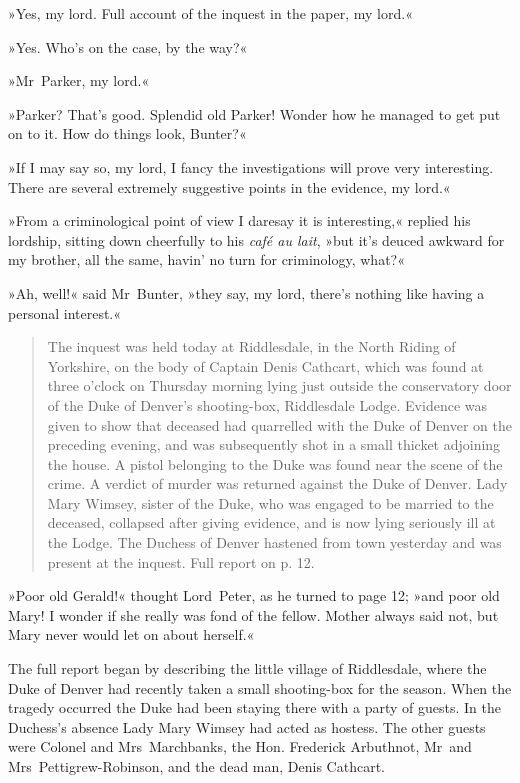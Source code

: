 »Yes, my lord. Full account of the inquest in the paper, my lord.«

»Yes. Who's on the case, by the way?«

»Mr~Parker, my lord.«

»Parker? That's good. Splendid old Parker! Wonder how he managed to get put on to it. How do things look, Bunter?«

»If I may say so, my lord, I fancy the investigations will prove very interesting. There are several extremely suggestive points in the evidence, my lord.«

»From a criminological point of view I daresay it is interesting,« replied his lordship, sitting down cheerfully to his \foreignlanguage{french}{\textit{café au lait}}, »but it's deuced awkward for my brother, all the same, havin' no turn for criminology, what?«

»Ah, well!« said Mr~Bunter, »they say, my lord, there's nothing like having a personal interest.«

\begin{quote}
\indent The inquest was held today at Riddlesdale, in the North Riding of Yorkshire, on the body of Captain Denis Cathcart, which was found at three o'clock on Thursday morning lying just outside the conservatory door of the Duke of Denver's shooting-box, Riddlesdale Lodge. Evidence was given to show that deceased had quarrelled with the Duke of Denver on the preceding evening, and was subsequently shot in a small thicket adjoining the house. A pistol belonging to the Duke was found near the scene of the crime. A verdict of murder was returned against the Duke of Denver. Lady Mary Wimsey, sister of the Duke, who was engaged to be married to the deceased, collapsed after giving evidence, and is now lying seriously ill at the Lodge. The Duchess of Denver hastened from town yesterday and was present at the inquest. Full report on p. 12.  
\end{quote}

»Poor old Gerald!« thought Lord~Peter, as he turned to page 12; »and poor old Mary! I wonder if she really was fond of the fellow. Mother always said not, but Mary never would let on about herself.«

The full report began by describing the little village of Riddlesdale, where the Duke of Denver had recently taken a small shooting-box for the season. When the tragedy occurred the Duke had been staying there with a party of guests. In the Duchess's absence Lady Mary Wimsey had acted as hostess. The other guests were Colonel and Mrs~Marchbanks, the Hon. Frederick Arbuthnot, Mr~and Mrs~Pettigrew-Robinson, and the dead man, Denis Cathcart.

